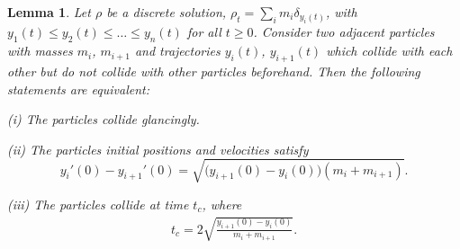 \documentclass[10pt,a4paper]{amsart}
\newtheorem{lemma}{Lemma}
\begin{document}
        \begin{lemma}\label{perfect-adjacent-particles}
            Let $\rho$ be a discrete solution, $\rho_t=\sum_i m_i\delta_{y_i(t)}$, with $y_1(t)\leq y_2(t)\leq\ldots\leq y_n(t)$ for all $t\geq0$. Consider two adjacent particles with masses $m_i$, $m_{i+1}$ and trajectories $y_i(t)$, $y_{i+1}(t)$ which collide with each other but do not collide with other particles beforehand. Then the following statements are equivalent:
           
            (i) The particles collide glancingly.

            (ii) The particles initial positions and velocities satisfy
            \begin{equation}\label{veloc-perfect}
                y_i'(0)-y_{i+1}'(0)=\sqrt{\big(y_{i+1}(0)-y_i(0)\big)(m_i+m_{i+1})}.
            \end{equation}

            (iii) The particles collide at time $t_c$, where 
            \begin{align}\label{TC}
                t_c=2\sqrt{\frac{y_{i+1}(0)-y_i(0)}{m_i+m_{i+1}}}.
            \end{align}
        \end{lemma}
\end{document}
